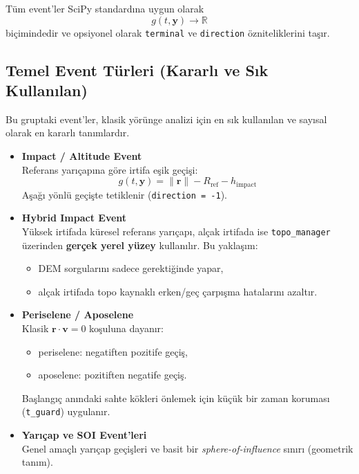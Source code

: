 Tüm event’ler SciPy standardına uygun olarak
\[
g(t,\mathbf{y}) \rightarrow \mathbb{R}
\]
biçimindedir ve opsiyonel olarak
\texttt{terminal} ve \texttt{direction} özniteliklerini taşır.

\subsection*{Temel Event Türleri (Kararlı ve Sık Kullanılan)}

Bu gruptaki event’ler, klasik yörünge analizi için en sık kullanılan ve
sayısal olarak en kararlı tanımlardır.

\begin{itemize}
  \item \textbf{Impact / Altitude Event} \\
  Referans yarıçapına göre irtifa eşik geçişi:
  \[
  g(t,\mathbf{y}) = \|\mathbf{r}\| - R_{\text{ref}} - h_{\text{impact}}
  \]
  Aşağı yönlü geçişte tetiklenir (\texttt{direction = -1}).

  \item \textbf{Hybrid Impact Event} \\
  Yüksek irtifada küresel referans yarıçapı,
  alçak irtifada ise \texttt{topo\_manager} üzerinden \textbf{gerçek yerel yüzey}
  kullanılır. Bu yaklaşım:
  \begin{itemize}
    \item DEM sorgularını sadece gerektiğinde yapar,
    \item alçak irtifada topo kaynaklı erken/geç çarpışma hatalarını azaltır.
  \end{itemize}

  \item \textbf{Periselene / Aposelene} \\
  Klasik \( \mathbf{r}\cdot\mathbf{v}=0 \) koşuluna dayanır:
  \begin{itemize}
    \item periselene: negatiften pozitife geçiş,
    \item aposelene: pozitiften negatife geçiş.
  \end{itemize}
  Başlangıç anındaki sahte kökleri önlemek için küçük bir zaman koruması
  (\texttt{t\_guard}) uygulanır.

  \item \textbf{Yarıçap ve SOI Event’leri} \\
  Genel amaçlı yarıçap geçişleri ve basit bir
  \emph{sphere-of-influence} sınırı (geometrik tanım).
\end{itemize}

